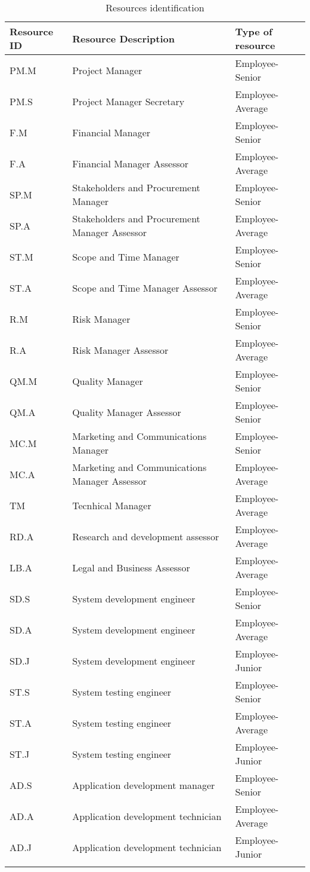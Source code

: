 \begin{longtable}{lll}
	
\toprule[2pt]

\textbf{Resource ID} & \textbf{Resource Description} & \textbf{Type of resource}  
		\\ \midrule[1.5pt] 
	
PM.M&Project Manager&Employee-Senior\\
PM.S&Project Manager Secretary&Employee-Average\\
F.M&Financial Manager&Employee-Senior\\
F.A&Financial Manager Assessor&Employee-Average\\
SP.M&Stakeholders and Procurement Manager&Employee-Senior\\
SP.A&Stakeholders and Procurement Manager Assessor&Employee-Average\\
ST.M&Scope and Time Manager&Employee-Senior\\
ST.A&Scope and Time Manager Assessor&Employee-Average\\
R.M&Risk Manager&Employee-Senior\\
R.A&Risk Manager Assessor&Employee-Average\\
QM.M&Quality Manager&Employee-Senior\\
QM.A&Quality Manager Assessor&Employee-Senior\\
MC.M&Marketing and Communications Manager&Employee-Senior\\
MC.A&Marketing and Communications Manager Assessor&Employee-Average\\
TM&Tecnhical Manager&Employee-Average\\
RD.A&Research and development assessor&Employee-Average\\
LB.A&Legal and Business Assessor&Employee-Average\\
SD.S&System development engineer&Employee-Senior\\
SD.A&System development engineer&Employee-Average\\
SD.J&System development engineer&Employee-Junior\\
ST.S&System testing engineer&Employee-Senior\\
ST.A&System testing engineer&Employee-Average\\
ST.J&System testing engineer&Employee-Junior\\
AD.S&Application development manager&Employee-Senior\\
AD.A&Application development technician&Employee-Average\\
AD.J&Application development technician&Employee-Junior\\

\bottomrule[2pt]

\caption{Resources identification}
\label{table_resourcesidentification}	
\end{longtable}

